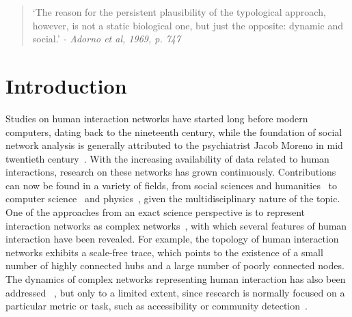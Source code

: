\documentclass[%
	aip,
	jmp,%
	amsmath,amssymb,
	reprint,%
]{revtex4-1}
\begin{document}
\begin{quotation}
	`The reason for the persistent plausibility of the typological approach, however, is not a static biological one, but just the opposite: dynamic and social.' 
	\emph{- Adorno et al, 1969, p. 747}
\end{quotation}


\section{Introduction}\label{sec:into}
Studies on human interaction networks have started long before modern computers, dating back to the nineteenth century, while the foundation of
social network analysis is generally attributed to the psychiatrist Jacob Moreno in mid twentieth century~\cite{newmanBook}. With the increasing availability of data related to human interactions, research on these networks has grown continuously. Contributions can now be found in a variety of fields, from social sciences and humanities~\cite{latour2013} to computer science~\cite{bird} and physics~\cite{barabasiHumanDyn,newmanFriendship}, given the multidisciplinary nature of the topic. One of the approaches from an exact science perspective is to represent interaction networks as complex networks~\cite{barabasiHumanDyn,newmanFriendship}, with which 
several features of human interaction have been revealed. For example, the topology of human interaction networks exhibits a scale-free trace, which points to the existence of a small number of highly connected hubs and a large number of poorly connected nodes. The dynamics of complex networks representing human interaction has also been addressed ~\cite{barabasiEvo,newmanEvolving}, but only to a limited extent, since research is normally focused on a particular metric or task, such as accessibility or community detection~\cite{access,newmanModularity}. 
\end{document}
